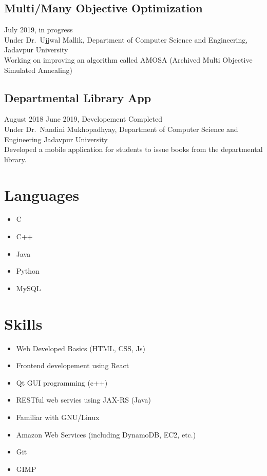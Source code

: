 \documentclass{article}
\begin{document}
\subsection{Multi/Many Objective Optimization}
July 2019, in progress\\
Under Dr.\ Ujjwal Mallik, 
Department of Computer Science and Engineering, 
Jadavpur University\\

Working on improving an algorithm called AMOSA
(Archived Multi Objective Simulated Annealing)

\subsection{Departmental Library App}
August 2018 \- June 2019, Developement Completed\\
Under Dr.\ Nandini Mukhopadhyay,
Department of Computer Science and Engineering
Jadavpur University\\

Developed a mobile application for students to issue books from
the departmental library.



\section{Languages} 
\begin{itemize}
	\item C
	\item C++
	\item Java
	\item Python
	\item MySQL
\end{itemize}

\section{Skills} 
\begin{itemize}
	\item Web Developed Basics (HTML, CSS, Js)
	\item Frontend developement using React
	\item Qt GUI programming (c++)
	\item RESTful web servies using JAX-RS (Java)
	\item Familiar with GNU/Linux 
	\item Amazon Web Services (including DynamoDB, EC2, etc.)
	\item Git
	\item GIMP
\end{itemize}
\end{document}
